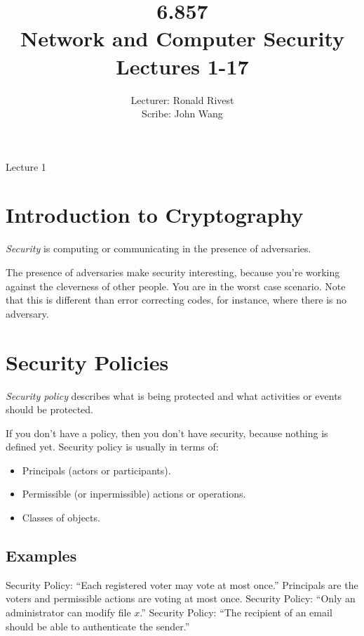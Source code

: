 \documentclass[psamsfonts]{amsart}
\title{6.857 \\
Network and Computer Security \\
Lectures 1-17}
\author{Lecturer: Ronald Rivest\\
Scribe: John Wang}
\begin{document}
\newpage
\Large{Lecture 1}


\maketitle

\section{Introduction to Cryptography}

\begin{def}
\emph{Security} is computing or communicating in the presence of adversaries.
\end{def}

The presence of adversaries make security interesting, because you're working against the cleverness of other people. You are in the worst case scenario. Note that this is different than error correcting codes, for instance, where there is no adversary.

\section{Security Policies}

\begin{def}
\emph{Security policy} describes what is being protected and what activities or events should be protected.
\end{def}

If you don't have a policy, then you don't have security, because nothing is defined yet. Security policy is usually in terms of:
\begin{itemize}
\item Principals (actors or participants).
\item Permissible (or inpermissible) actions or operations.
\item Classes of objects. 
\end{itemize}

\subsection{Examples}

Security Policy: ``Each registered voter may vote at most once.'' Principals are the voters and permissible actions are voting at most once.
Security Policy: ``Only an administrator can modify file $x$.'' 
Security Policy: ``The recipient of an email should be able to authenticate the sender.'' 
\end{document}
